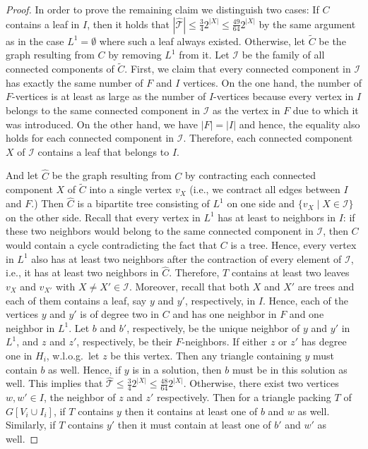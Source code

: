 \documentclass[a4paper,UKenglish,cleveref, autoref, thm-restate]{lipics-v2021}
\begin{document}
\begin{proof}
    In order to prove the remaining claim we distinguish two cases:
    If $C$ contains a leaf in $I$, then it holds that $|\hat{\mathcal{T}}| \leq \frac{3}{4} 2^{|X|} \leq \frac{49}{64} 2^{|X|}$ by the same argument as in the case $L^1=\emptyset$ where such a leaf always existed. 
    Otherwise, let $\tilde{C}$ be the graph resulting from $C$ by removing $L^1$ from it.     
    Let $\mathcal{I}$ be the family of all connected components of $\tilde C$.
    First, we claim that every connected component in $\mathcal{I}$ has exactly the same number of $F$ and $I$ vertices. 
    On the one hand, the number of $F$-vertices is at least as large as the number of $I$-vertices because every vertex in $I$ belongs to the same connected component in $\mathcal{I}$ as the vertex in $F$ due to which it was introduced.
    On the other hand, we have $|F| = |I|$ and hence, the equality also holds for each connected component in $\mathcal{I}$.
    Therefore, each connected component $X$ of $\mathcal{I}$ contains a leaf that belongs to $I$.
    
    And let $\hat{C}$ be the graph resulting from $C$ by contracting each connected component $X$ of $\tilde C$ into a single vertex $v_X$ (i.e., we contract all edges between $I$ and $F$.) Then $\hat{C}$ is a bipartite tree consisting of $L^1$ on one side and $\{v_X \mid X \in \mathcal{I}\}$ on the other side. 
    Recall that every vertex in $L^1$ has at least to neighbors in $I$: if these two neighbors would belong to the same connected component in $\mathcal{I}$, then $C$ would contain a cycle contradicting the fact that $C$ is a tree.
    Hence, every vertex in $L^1$ also has at least two neighbors after the contraction of every element of $\mathcal{I}$, i.e., it has at least two neighbors in $\hat{C}$.
    Therefore, $T$ contains at least two leaves $v_{X}$ and $v_{X'}$ with $X \neq X' \in \mathcal{I}$. 
    Moreover, recall that both $X$ and $X'$ are trees and each of them contains a leaf, say $y$ and $y'$, respectively, in $I$. 
    Hence, each of the vertices $y$ and $y'$ is of degree two in $C$ and has one neighbor in $F$ and one neighbor in $L^1$. 
    Let $b$ and $b'$, respectively, be the unique neighbor of $y$ and $y'$ in $L^1$, and $z$ and $z'$, respectively, be their $F$-neighbors. If either $z$ or $z'$ has degree one in $H_i$, w.l.o.g.\ let $z$ be this vertex. Then any triangle containing $y$ must contain $b$ as well. Hence, if $y$ is in a solution, then $b$ must be in this solution as well. This implies that
    $\hat{\mathcal{T}} \leq \frac{3}{4} 2^{|X|} \leq \frac{48}{64}2^{|X|}$.
    Otherwise, there exist two vertices $w,w'\in I$, the neighbor of $z$ and $z'$ respectively.
    Then for a triangle packing $T$ of $G[V_i \cup I_i]$, if $T$ contains $y$ then it contains at least one of $b$ and $w$ as well. Similarly, if $T$ contains $y'$ then it must contain at least one of $b'$ and $w'$ as well.
    

\end{proof}
\end{document}
